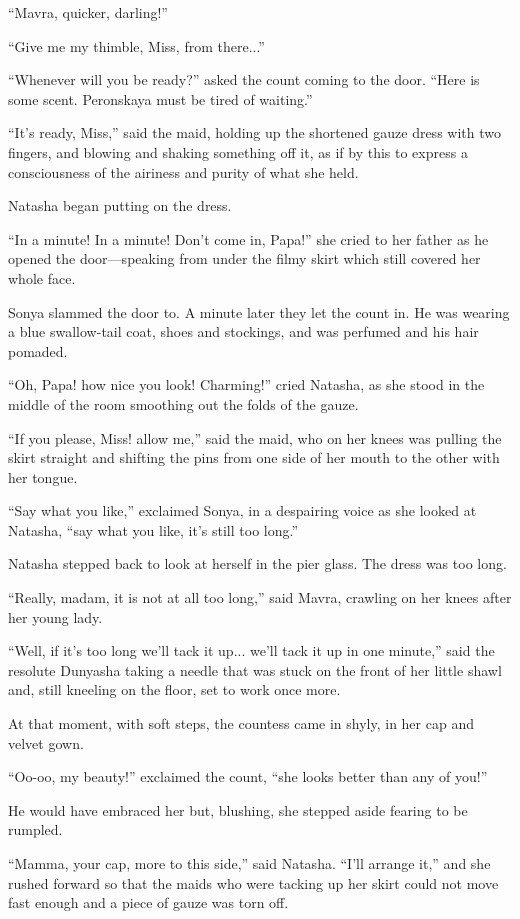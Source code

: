 ``Mavra, quicker, darling!''

``Give me my thimble, Miss, from there...''

``Whenever will you be ready?'' asked the count coming to the
door. ``Here is some scent. Peronskaya must be tired of
waiting.''

``It's ready, Miss,'' said the maid, holding up the shortened
gauze dress with two fingers, and blowing and shaking something
off it, as if by this to express a consciousness of the airiness
and purity of what she held.

Natasha began putting on the dress.

``In a minute! In a minute! Don't come in, Papa!'' she cried to
her father as he opened the door---speaking from under the filmy
skirt which still covered her whole face.

Sonya slammed the door to. A minute later they let the count
in. He was wearing a blue swallow-tail coat, shoes and stockings,
and was perfumed and his hair pomaded.

``Oh, Papa! how nice you look! Charming!'' cried Natasha, as she
stood in the middle of the room smoothing out the folds of the
gauze.

``If you please, Miss! allow me,'' said the maid, who on her
knees was pulling the skirt straight and shifting the pins from
one side of her mouth to the other with her tongue.

``Say what you like,'' exclaimed Sonya, in a despairing voice as
she looked at Natasha, ``say what you like, it's still too
long.''

Natasha stepped back to look at herself in the pier glass. The
dress was too long.

``Really, madam, it is not at all too long,'' said Mavra,
crawling on her knees after her young lady.

``Well, if it's too long we'll tack it up... we'll tack it up in
one minute,'' said the resolute Dunyasha taking a needle that was
stuck on the front of her little shawl and, still kneeling on the
floor, set to work once more.

At that moment, with soft steps, the countess came in shyly, in
her cap and velvet gown.

``Oo-oo, my beauty!'' exclaimed the count, ``she looks better
than any of you!''

He would have embraced her but, blushing, she stepped aside
fearing to be rumpled.

``Mamma, your cap, more to this side,'' said Natasha. ``I'll
arrange it,'' and she rushed forward so that the maids who were
tacking up her skirt could not move fast enough and a piece of
gauze was torn off.

